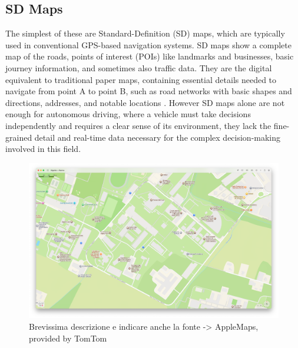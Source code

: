 \subsection{SD Maps}
The simplest of these are Standard-Definition (SD) maps, which are typically used in conventional GPS-based navigation systems. SD maps show a complete map of the roads, points of interest (POIs) like landmarks and businesses, basic journey information, and sometimes also traffic data. They are the digital equivalent to traditional paper maps, containing essential details needed to navigate from point A to point B, such as road networks with basic shapes and directions, addresses, and notable locations \cite{Mudduluru_SD_vs_HD_Maps, Chiang2021}.
However SD maps alone are not enough for autonomous driving, where a vehicle must take decisions independently and requires a clear sense of its environment, they lack the fine-grained detail and real-time data necessary for the complex decision-making involved in this field.
\begin{figure}[H]
    \centering
    \includegraphics[width=0.65\linewidth]{LateX//figs/SD_MAP.png}
    \caption{Brevissima descrizione e indicare anche la fonte -> AppleMaps, provided by TomTom}
    \label{fig:enter-label}
\end{figure}

